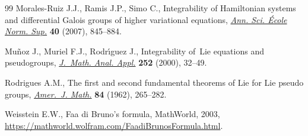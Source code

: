 \documentclass[10pt,a4paper]{amsart}
\numberwithin{equation}{section}
\theoremstyle{definition}
\begin{document}
\begin{thebibliography}{99}
Morales-Ruiz J.J., Ramis J.P., Simo C., Integrability of {H}amiltonian systems
 and differential {G}alois groups of higher variational equations,
 \href{https://doi.org/10.1016/j.ansens.2007.09.002}{\textit{Ann. Sci.
 \'{E}cole Norm. Sup.}} \textbf{40} (2007), 845--884.

Mu\~noz J., Muriel F.J., Rodr\'{\i}guez J., Integrability of~{L}ie equations
 and pseudogroups,
 \href{https://doi.org/10.1006/jmaa.2000.6805}{\textit{J.~Math. Anal. Appl.}}
 \textbf{252} (2000), 32--49.

Rodrigues A.M., The first and second fundamental theorems of {L}ie for {L}ie
 pseudo groups, \href{https://doi.org/10.2307/2372762}{\textit{Amer.~J.
 Math.}} \textbf{84} (1962), 265--282.

Weisstein E.W., Faa di {B}runo's formula, {M}athWorld, 2003,
 \url{https://mathworld.wolfram.com/FaadiBrunosFormula.html}.

\end{thebibliography}
\end{document}
